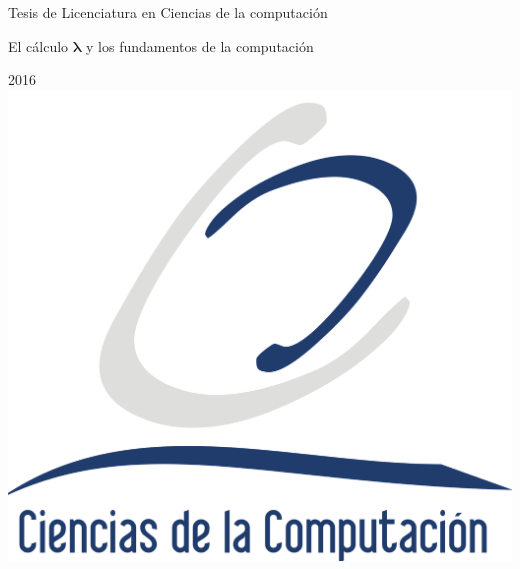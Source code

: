 \documentclass[letterpaper, twoside, openright, 11pt]{book}
\theoremstyle{plain}%
\theoremstyle{definition}
\theoremstyle{remark}
\newcommand{\bs}{\boldsymbol}
\begin{document}


\thispagestyle{empty}
\begin{center}
  {\Large {\sf Tesis de Licenciatura en Ciencias de la computación}}

  \vspace{5cm}

  {\Huge El cálculo \( \bs{λ} \) y los fundamentos de la computación}

  \vspace{1cm}
  {\large 2016}
  \vfill
  \includegraphics[width=.2\textwidth]{figuras/logoLCC.png}
\end{center}

\cleardoublepage
\thispagestyle{empty}
\end{document}
